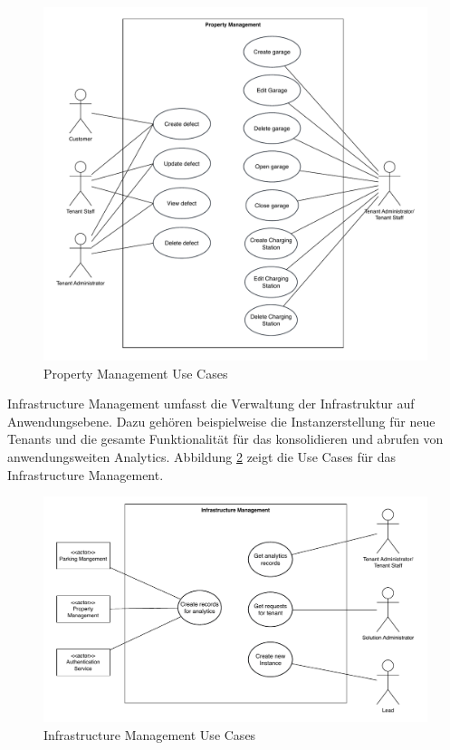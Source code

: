 \begin{figure}[H]
    \centering
    \includegraphics[width=\textwidth]{resources/prop-ma-use-cases.pdf}
    \caption{Property Management Use Cases}
    \label{fig:prop-ma-use-cases}
\end{figure}

Infrastructure Management umfasst die Verwaltung der Infrastruktur auf Anwendungsebene. Dazu gehören beispielweise die Instanzerstellung für neue Tenants und die gesamte Funktionalität für das konsolidieren und abrufen von anwendungsweiten Analytics. Abbildung \ref{fig:inf-ma-use-cases} zeigt die Use Cases für das Infrastructure Management.

\begin{figure}[H]
    \centering
    \includegraphics[width=\textwidth]{resources/inf-ma-use-cases.pdf}
    \caption{Infrastructure Management Use Cases}
    \label{fig:inf-ma-use-cases}
\end{figure}

